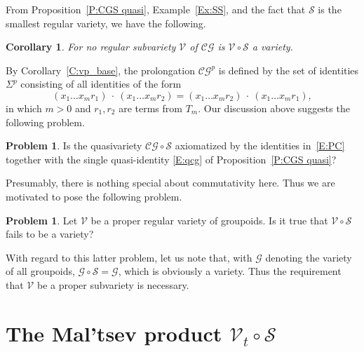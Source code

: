 \documentclass{birkau}
\newcommand{\mc}{\mathcal}
\newcommand{\mcV}{\mathcal{V}}
\newcommand{\mcS}{\mathcal{S}}
\newcommand{\pro}[1]{{#1}^p}
\theoremstyle{plain}
\newtheorem{corollary}[theorem]{Corollary}
\theoremstyle{definition}
\newtheorem{problem}[theorem]{Problem}
\numberwithin{equation}{section}
\begin{document}
From  Proposition~\ref{P:CGS quasi}, Example~\ref{Ex:SS}, and the fact that $\mcS$ is the
smallest regular variety, we have the following.

\begin{corollary}
For no regular subvariety $\mcV$ of $\mc{CG}$ is $\mcV\circ\mcS$ a variety.
\end{corollary}

By Corollary~\ref{C:vp_base}, the prolongation $\pro{\mathcal{CG}}$ is defined by the set of identities
$\Sigma^p$ consisting of all identities of the form
\begin{equation}
  \label{E:PC}
  (x_1\ldots x_m r_1) \ \cdot \ (x_1\ldots x_m r_2) =  (x_1\ldots x_m r_2) \ \cdot \ (x_1\ldots x_m r_1),
\end{equation}
in which $m > 0$ and $r_1, r_2$ are terms from $T_m$. Our discussion above suggests the
following problem.

\begin{problem}
Is the quasivariety $\mathcal{CG} \circ \mcS$ axiomatized by the identities in~\eqref{E:PC}
together with the single quasi-identity \eqref{E:qcg} of Proposition~\ref{P:CGS quasi}?
\end{problem}

Presumably, there is nothing special about commutativity here. Thus we are motivated to
pose the following problem.

\begin{problem}
 Let $\mcV$ be a proper regular variety of groupoids. Is it true that $\mcV \circ \mcS$
 fails to be a variety?
\end{problem}

With regard to this latter problem, let us note that, with $\mathcal G$ denoting the variety
of all groupoids, $\mathcal G \circ \mcS =
\mathcal G$, which is obviously a variety. Thus the requirement that $\mcV$ be a proper subvariety is necessary.

\section{The Mal'tsev product $\mcV_t \circ \mcS$}\label{S:Vt}
\end{document}
